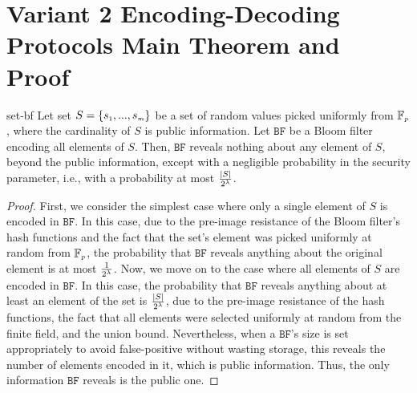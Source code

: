 
\section{Variant 2 Encoding-Decoding Protocols Main Theorem and Proof}\label{sec::Variant-2-Theorem-proof}

\begin{reptheorem}{set-bf}
Let set $S=\{s_{\scriptscriptstyle 1},..., s_{\scriptscriptstyle m}\}$ be a set of random values picked uniformly from $\mathbb{F}_{\scriptscriptstyle p}$, where the cardinality of $S$ is  public information. Let $\mathtt{BF}$ be a Bloom filter encoding all elements of   $S$. Then,  $\mathtt{BF}$ reveals nothing about any element of $S$, beyond the public information, except with a negligible probability in the security parameter, i.e., with a probability at most $\frac{|S|}{2^{\scriptscriptstyle \lambda}}$. 
\end{reptheorem}

\begin{proof}
First, we consider the simplest case where only a single element  of $S$ is encoded in $\mathtt{BF}$. In this case, due to the pre-image resistance of the Bloom filter's hash functions and the fact that the set's element was picked uniformly at random from $\mathbb{F}_{\scriptscriptstyle p}$, the probability that $\mathtt{BF}$ reveals anything about the original element is at most $\frac{1}{2^{\scriptscriptstyle \lambda}}$. Now, we move on to the  case where all elements of $S$ are encoded in $\mathtt{BF}$. In this case, the probability that $\mathtt{BF}$ reveals anything about at least an element of the set is $\frac{|S|}{2^{\scriptscriptstyle \lambda}}$, due to  the pre-image resistance of the hash functions,  the fact that all elements were selected  uniformly at random from the finite field, and the union bound. Nevertheless, when a $\mathtt{BF}$'s size is set appropriately to avoid false-positive without wasting storage, this reveals the number of elements encoded in it, which is public information.  Thus, the only information $\mathtt{BF}$ reveals is the public one.  
\end{proof}